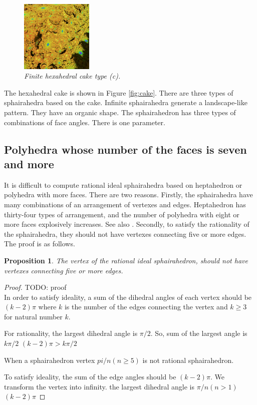 \documentclass[suppldata, dvipdfmx]{interact}
\theoremstyle{plain}%
\newtheorem{proposition}[theorem]{Proposition}
\theoremstyle{definition}
\theoremstyle{remark}
\theoremstyle{problemstyle}
\begin{document}
\begin{figure}[H]
\begin{minipage}{0.5\textwidth}
  \begin{minipage}[t]{0.24\textwidth}
   \centering
   \includegraphics[width=1.35in, height=1.35in,
   keepaspectratio]{./img/sphairahedron/hexahedralCake2/limitsetInf_c.png} 
  \end{minipage}
  \hspace*{\fill}
  \caption{\textit{Finite hexahedral cake type (c).}}
  \label{}
 \end{minipage}
\end{figure}

The hexahedral cake is shown in Figure \ref{fig:cake}. There are three
types of sphairahedra based on the cake.
Infinite sphairahedra generate a landscape-like pattern.
They have an organic shape.
The sphairahedron has three types of combinations of face angles.
There is one parameter.

\subsection{Polyhedra whose number of the faces is seven and more}

It is difficult to compute rational ideal sphairahedra based on
heptahedron or polyhedra with more faces.
There are two reasons.
Firstly, the sphairahedra have many combinations of an arrangement of
vertexes and edges. 
Heptahedron has thirty-four types of arrangement, and
the number of polyhedra with eight or more faces explosively
increases. See also \cite{countingPolyhedra}.
Secondly, to satisfy the rationality of the sphairahedra, they should not
have vertexes connecting five or more edges.
The proof is as follows.

\begin{proposition}
 The vertex of the rational ideal sphairahedron, should not
 have vertexes connecting five or more edges.
\end{proposition}

\begin{proof}
 TODO: proof\\
 In order to satisfy ideality, a sum of the dihedral angles of each vertex
 should be $(k - 2) \pi$ where $k$ is the number of the edges connecting
 the vertex and $k \geq 3$ for natural number $k$.

 For rationality, 
 the largest dihedral angle is $\pi / 2$.
 So, sum of the largest angle is $k\pi / 2$
 $(k -  2)\pi > k\pi / 2$

 When a sphairahedron 
 vertex $pi / n (n \geq 5)$
 is not rational sphairahedron.

 To satisfy ideality, the sum of the edge angles should be $(k - 2) \pi$.
 We transform the vertex into infinity.
 the largest dihedral angle is $\pi / n (n > 1)$
 $(k - 2)\pi$
\end{proof}
\end{document}
